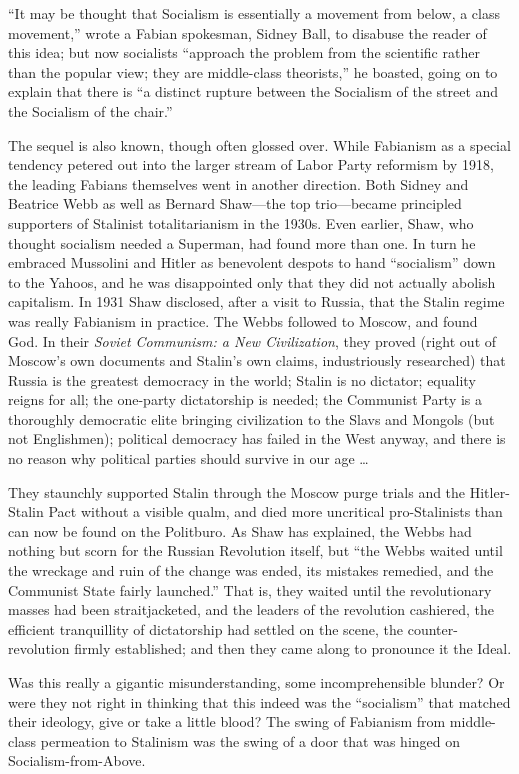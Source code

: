 ``It may be thought that Socialism is essentially a movement from below, a class movement,'' wrote a Fabian spokesman, Sidney Ball, to disabuse the reader of this idea; but now socialists ``approach the problem from the scientific rather than the popular view; they are middle-class theorists,'' he boasted, going on to explain that there is ``a distinct rupture between the Socialism of the street and the Socialism of the chair.''

The sequel is also known, though often glossed over. While Fabianism as a special tendency petered out into the larger stream of Labor Party reformism by 1918, the leading Fabians themselves went in another direction. Both Sidney and Beatrice Webb as well as Bernard Shaw---the top trio---became principled supporters of Stalinist totalitarianism in the 1930s. Even earlier, Shaw, who thought socialism needed a Superman, had found more than one. In turn he embraced Mussolini and Hitler as benevolent despots to hand ``socialism'' down to the Yahoos, and he was disappointed only that they did not actually abolish capitalism. In 1931 Shaw disclosed, after a visit to Russia, that the Stalin regime was really Fabianism in practice. The Webbs followed to Moscow, and found God. In their \emph{Soviet Communism: a New Civilization}, they proved (right out of Moscow's own documents and Stalin's own claims, industriously researched) that Russia is the greatest democracy in the world; Stalin is no dictator; equality reigns for all; the one-party dictatorship is needed; the Communist Party is a thoroughly democratic elite bringing civilization to the Slavs and Mongols (but not Englishmen); political democracy has failed in the West anyway, and there is no reason why political parties should survive in our age \ldots\

They staunchly supported Stalin through the Moscow purge trials and the Hitler-Stalin Pact without a visible qualm, and died more uncritical pro-Stalinists than can now be found on the Politburo. As Shaw has explained, the Webbs had nothing but scorn for the Russian Revolution itself, but ``the Webbs waited until the wreckage and ruin of the change was ended, its mistakes remedied, and the Communist State fairly launched.'' That is, they waited until the revolutionary masses had been straitjacketed, and the leaders of the revolution cashiered, the efficient tranquillity of dictatorship had settled on the scene, the counter-revolution firmly established; and then they came along to pronounce it the Ideal.

Was this really a gigantic misunderstanding, some incomprehensible blunder? Or were they not right in thinking that this indeed was the ``socialism'' that matched their ideology, give or take a little blood? The swing of Fabianism from middle-class permeation to Stalinism was the swing of a door that was hinged on Socialism-from-Above.

